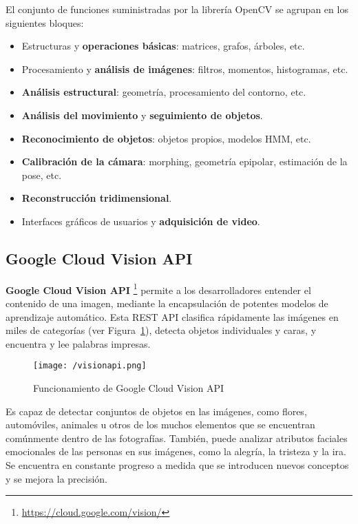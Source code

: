 El conjunto de funciones suministradas por la librería OpenCV se agrupan en los siguientes bloques: 
\begin{itemize}
\item Estructuras y \textbf{operaciones básicas}: matrices, grafos, árboles, etc.
\item Procesamiento y \textbf{análisis de imágenes}: filtros, momentos, histogramas, etc.
\item \textbf{Análisis estructural}: geometría, procesamiento del contorno, etc.
\item \textbf{Análisis del movimiento} y \textbf{seguimiento de objetos}.
\item \textbf{Reconocimiento de objetos}: objetos propios, modelos \acs{HMM}, etc.
\item \textbf{Calibración de la cámara}: morphing, geometría epipolar, estimación de la pose, etc.
\item \textbf{Reconstrucción tridimensional}.
\item Interfaces gráficos de usuarios y \textbf{adquisición de video}.
\end{itemize}

\subsection{Google Cloud Vision API}
\label{sec:visionapi}

\textbf{Google Cloud Vision API} \footnote{\url{https://cloud.google.com/vision/}} permite a los desarrolladores entender el contenido de una imagen, mediante la encapsulación de potentes modelos de aprendizaje automático. Esta REST API clasifica rápidamente las imágenes en miles de categorías (ver Figura~\ref{fig:visionapi}), detecta objetos individuales y caras, y encuentra y lee palabras impresas.

\begin{figure}[!h]
\begin{center}
\texttt{[image: /visionapi.png]}
\caption[Funcionamiento de Google Cloud Vision API]{Funcionamiento de Google Cloud Vision API}
\label{fig:visionapi}
\end{center}
\end{figure}

Es capaz de detectar conjuntos de objetos en las imágenes, como flores, automóviles, animales u otros de los muchos elementos 
que se encuentran comúnmente dentro de las fotografías. También, puede analizar atributos faciales emocionales de las personas en sus imágenes, como la alegría, la tristeza y la ira. Se encuentra en constante progreso a medida que se introducen nuevos conceptos y se mejora la precisión.

